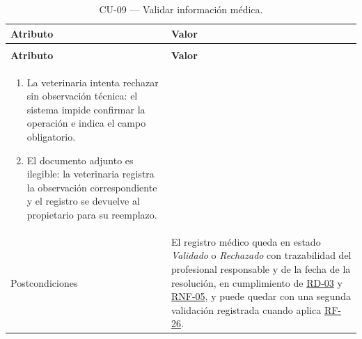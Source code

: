 \documentclass[journal,onecolumn]{IEEEtran}
\makeatletter
\newenvironment{atributos}[2]{%
	\small
	\begin{longtable}{@{}>{\raggedright\arraybackslash}p{4.2cm} >{\raggedright\arraybackslash}p{11.2cm}@{}}
		\caption{#2}\label{tab:#1}\\
		\toprule
		\textbf{Atributo} & \textbf{Valor} \\
		\midrule
		\endfirsthead
		\multicolumn{2}{@{}l}{\small\itshape (continuación)}\\
		\toprule
		\textbf{Atributo} & \textbf{Valor} \\
		\midrule
		\endhead
		\bottomrule
		\endlastfoot
	}{%
	\end{longtable}
	\normalsize
}
\makeatother
\begin{document}
\begin{atributos}{CU-09}{CU-09 --- Validar información médica.}
\begin{enumerate}[leftmargin=*, nosep]
			\item[4.2] La veterinaria intenta rechazar sin observación técnica: el sistema impide confirmar la operación e indica el campo obligatorio.
			\item[3.1] El documento adjunto es ilegible: la veterinaria registra la observación correspondiente y el registro se devuelve al propietario para su reemplazo.
		\end{enumerate} \\
		Postcondiciones & El registro médico queda en estado \emph{Validado} o \emph{Rechazado} con trazabilidad del profesional responsable y de la fecha de la resolución, en cumplimiento de \hyperref[tab:RD-03]{RD-03} y \hyperref[tab:RNF-05]{RNF-05}, y puede quedar con una segunda validación registrada cuando aplica \hyperref[tab:RF-26]{RF-26}. \\
	\end{atributos}
	
\end{document}
